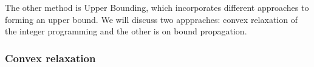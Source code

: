 The other method is Upper Bounding, which incorporates different approaches to forming an upper bound. We will discuss two apppraches: convex relaxation of the integer programming and the other is \betaased on bound propagation.

\subsubsection{Convex relaxation}






